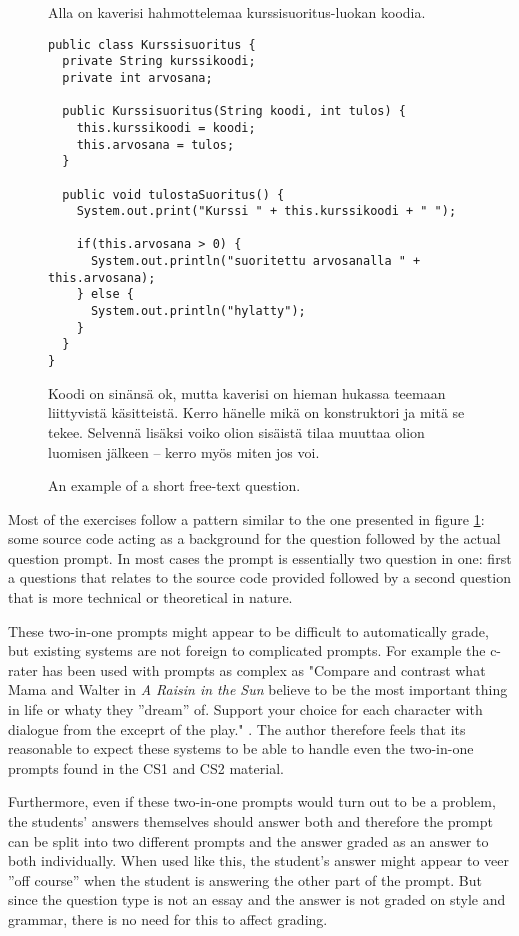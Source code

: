 \documentclass[english]{tktltiki2}
\theoremstyle{definition}
\theoremstyle{remark}
\begin{document}
\begin{figure}[h]
	\begin{mdframed}
		Alla on kaverisi hahmottelemaa kurssisuoritus-luokan koodia.

		\begin{lstlisting}
public class Kurssisuoritus {
  private String kurssikoodi;
  private int arvosana;

  public Kurssisuoritus(String koodi, int tulos) {
    this.kurssikoodi = koodi;
    this.arvosana = tulos;
  }
    
  public void tulostaSuoritus() {
    System.out.print("Kurssi " + this.kurssikoodi + " ");
        
    if(this.arvosana > 0) {
      System.out.println("suoritettu arvosanalla " + this.arvosana);
    } else {
      System.out.println("hylatty");
    }
  }
}
		\end{lstlisting}
	
		Koodi on sinänsä ok, mutta kaverisi on hieman hukassa teemaan liittyvistä käsitteistä. Kerro hänelle mikä on konstruktori ja mitä se tekee. Selvennä lisäksi voiko olion sisäistä tilaa muuttaa olion luomisen jälkeen -- kerro myös miten jos voi. 
	\end{mdframed}
	\caption{An example of a short free-text question.}
	\label{fig:selitystehtava}
\end{figure}

Most of the exercises follow a pattern similar to the one presented in figure \ref{fig:selitystehtava}: some source code acting as a background for the question followed by the actual question prompt. In most cases the prompt is essentially two question in one: first a questions that relates to the source code provided followed by a second question that is more technical or theoretical in nature.

These two-in-one prompts might appear to be difficult to automatically grade, but existing systems are not foreign to complicated prompts. For example the c-rater \cite{leacock03} has been used with prompts as complex as "Compare and contrast what Mama and Walter in \emph{A Raisin in the Sun} believe to be the most important thing in life or whaty they ''dream'' of. Support your choice for each character with dialogue from the exceprt of the play." \cite{leacock03}. The author therefore feels that its reasonable to expect these systems to be able to handle even the two-in-one prompts found in the CS1 and CS2 material.

Furthermore, even if these two-in-one prompts would turn out to be a problem, the students' answers themselves should answer both and therefore the prompt can be split into two different prompts and the answer graded as an answer to both individually. When used like this, the student's answer might appear to veer ''off course'' when the student is answering the other part of the prompt. But since the question type is not an essay and the answer is not graded on style and grammar, there is no need for this to affect grading.
\end{document}
